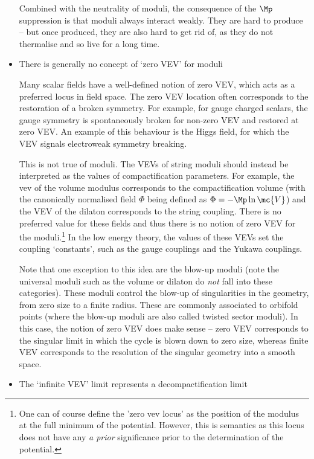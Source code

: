 \begin{itemize}
Combined with the neutrality of moduli, the consequence of the $\Mp$ suppression is that moduli always interact weakly. They are hard to produce -- but once produced, they are also hard to get rid of, as they do not thermalise and so live for a long time.

\item{There is generally no concept of `zero VEV' for moduli}

Many scalar fields have a well-defined notion of zero VEV, which acts as a preferred locus in field space. The zero VEV location often
corresponds to the restoration of a broken symmetry. For example, for gauge charged scalars, the gauge symmetry is spontaneously broken for non-zero VEV and restored at zero VEV. An example of this behaviour is the Higgs field, for which the VEV signals electroweak symmetry breaking.

This is not true of moduli. The VEVs of string moduli should instead be interpreted as the values of compactification parameters. For example, the vev of the volume modulus corresponds to the compactification volume (with the canonically normalised field $\Phi$ being defined as $\Phi = - \Mp \ln \mc{V}$) and the VEV of the dilaton corresponds to the string coupling. There is no preferred value for these fields and thus there is no notion of zero VEV for the moduli.\footnote{One can of course define the 'zero vev locus' as the position of the modulus at the full minimum of the potential. However, this is semantics as this locus does not have any \emph{a prior} significance prior to the determination of the potential.} In the low energy theory, the values of these VEVs set the coupling `constants', such as the gauge couplings and the Yukawa couplings.

Note that one exception to this idea are the blow-up moduli (note the universal moduli such as the volume or dilaton do \emph{not} fall into these categories). These moduli control the blow-up of singularities in the geometry, from zero size to a finite radius. These are commonly associated to orbifold points (where the blow-up moduli are also called twisted sector moduli). In this case, the notion of zero VEV does make sense -- zero VEV corresponds to the singular limit in which the cycle is blown down to zero size, whereas finite VEV corresponds to the resolution of the singular geometry into a smooth space.

\item{The `infinite VEV' limit represents a decompactification limit}


\end{itemize}
